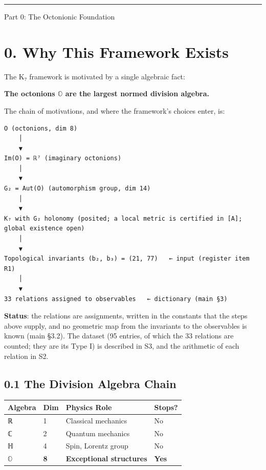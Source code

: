 \documentclass[11pt,a4paper]{article}
\begin{document}
\begin{center}\rule{\linewidth}{0.5pt}\end{center}

Part 0: The Octonionic Foundation

\section{0. Why This Framework Exists}\label{why-this-framework-exists}

The K₇ framework is motivated by a single algebraic fact:

\textbf{The octonions \ensuremath{\mathbb{O}} are the largest normed division algebra.}

The chain of motivations, and where the framework's choices enter, is:

\begin{verbatim}
O (octonions, dim 8)
    │
    ▼
Im(O) = ℝ⁷ (imaginary octonions)
    │
    ▼
G₂ = Aut(O) (automorphism group, dim 14)
    │
    ▼
K₇ with G₂ holonomy (posited; a local metric is certified in [A]; global existence open)
    │
    ▼
Topological invariants (b₂, b₃) = (21, 77)   ← input (register item R1)
    │
    ▼
33 relations assigned to observables   ← dictionary (main §3)
\end{verbatim}

\textbf{Status}: the relations are assignments, written in the constants that the steps above supply, and no geometric map from the invariants to the observables is known (main §3.2). The dataset (95 entries, of which the 33 relations are counted; they are its Type I) is described in S3, and the arithmetic of each relation in S2.

\subsection{0.1 The Division Algebra Chain}\label{the-division-algebra-chain}

\begin{longtable}[]{@{}llll@{}}
\toprule\noalign{}
Algebra & Dim & Physics Role & Stops? \\
\midrule\noalign{}
\endhead
\bottomrule\noalign{}
\endlastfoot
ℝ & 1 & Classical mechanics & No \\
ℂ & 2 & Quantum mechanics & No \\
ℍ & 4 & Spin, Lorentz group & No \\
\textbf{\ensuremath{\mathbb{O}}} & \textbf{8} & \textbf{Exceptional structures} & \textbf{Yes} \\
\end{longtable}
\end{document}
